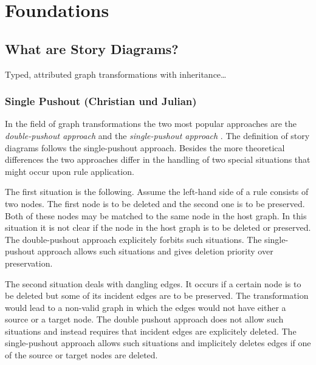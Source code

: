 \chapter{Foundations}


\section{What are Story Diagrams?}

Typed, attributed graph transformations with inheritance\ldots

\subsection{Single Pushout (Christian und Julian)}

In the field of graph transformations the two most popular approaches are the
\emph{double-pushout approach} \cite{Roz97} and the \emph{single-pushout
approach} \cite{Roz97}. The definition of story diagrams follows the
single-pushout approach. Besides the more theoretical differences the two
approaches differ in the handling of two special situations that might occur
upon rule application.

The first situation is the following. Assume the left-hand side of a rule
consists of two nodes. The first node is to be deleted and the second one is
to be preserved. Both of these nodes may be matched to the same node in the host
graph. In this situation it is not clear if the node in the host graph is to be
deleted or preserved. The double-pushout approach explicitely forbits such
situations. The single-pushout approach allows such situations and gives
deletion priority over preservation.

The second situation deals with dangling edges. It occurs if a certain node is
to be deleted but some of its incident edges are to be preserved. The
transformation would lead to a non-valid graph in which the edges would not have
either a source or a target node. The double pushout approach does not allow
such situations and instead requires that incident edges are explicitely
deleted. The single-pushout approach allows such situations and implicitely
deletes edges if one of the source or target nodes are deleted.
